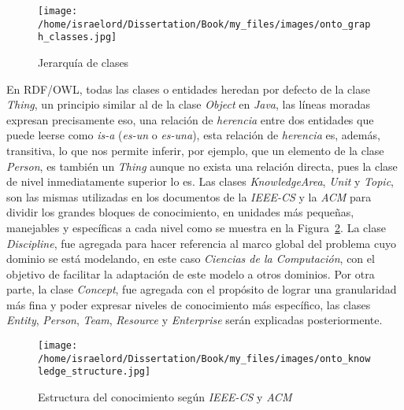 \begin{figure}
    \begin{center}
        \texttt{[image: /home/israelord/Dissertation/Book/my\_files/images/onto\_graph\_classes.jpg]}
        \caption{Jerarquía de clases}
        \label{classHierarchy}
    \end{center}
\end{figure}

En RDF/OWL, todas las clases o entidades heredan por defecto de la clase \textit{Thing}, un principio similar al de la clase \textit{Object} en \textit{Java}, las líneas moradas expresan precisamente eso, una relación de \textit{herencia} entre dos entidades que puede leerse como \textit{is-a} (\textit{es-un} o \textit{es-una}), esta relación de \textit{herencia} es, además, transitiva, lo que nos permite inferir, por ejemplo, que un elemento de la clase \textit{Person}, es también un \textit{Thing} aunque no exista una relación directa, pues la clase de nivel inmediatamente superior lo es. Las clases \textit{KnowledgeArea}, \textit{Unit} y \textit{Topic}, son las mismas utilizadas en los documentos de la \textit{IEEE-CS} y la \textit{ACM} para dividir los grandes bloques de conocimiento, en unidades más pequeñas, manejables y específicas a cada nivel como se muestra en la Figura~\ref{knowledgeStructure}. La clase \textit{Discipline}, fue agregada para hacer referencia al marco global del problema cuyo dominio se está modelando, en este caso \textit{Ciencias de la Computación}, con el objetivo de facilitar la adaptación de este modelo a otros dominios. Por otra parte, la clase \textit{Concept}, fue agregada con el propósito de lograr una granularidad más fina y poder expresar niveles de conocimiento más específico, las clases \textit{Entity}, \textit{Person}, \textit{Team}, \textit{Resource} y \textit{Enterprise} serán explicadas posteriormente.
\newpage

\begin{figure}
    \begin{center}
        \texttt{[image: /home/israelord/Dissertation/Book/my\_files/images/onto\_knowledge\_structure.jpg]}
        \caption{Estructura del conocimiento según \textit{IEEE-CS} y \textit{ACM}}
        \label{knowledgeStructure}
    \end{center}
\end{figure}

